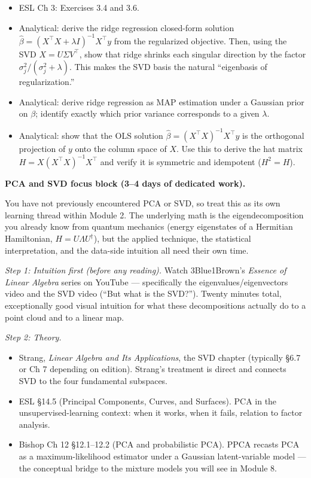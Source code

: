 \begin{itemize}
\tightlist
\item
  ESL Ch 3: Exercises 3.4 and 3.6.
\item
  Analytical: derive the ridge regression closed-form solution
  \(\hat{\beta} = (X^\top X + \lambda I)^{-1} X^\top y\) from the
  regularized objective. Then, using the SVD \(X = U \Sigma V^\top\),
  show that ridge shrinks each singular direction by the factor
  \(\sigma_j^2 / (\sigma_j^2 + \lambda)\). This makes the SVD basis the
  natural ``eigenbasis of regularization.''
\item
  Analytical: derive ridge regression as MAP estimation under a Gaussian
  prior on \(\beta\); identify exactly which prior variance corresponds
  to a given \(\lambda\).
\item
  Analytical: show that the OLS solution
  \(\hat{\beta} = (X^\top X)^{-1} X^\top y\) is the orthogonal
  projection of \(y\) onto the column space of \(X\). Use this to derive
  the hat matrix \(H = X(X^\top X)^{-1} X^\top\) and verify it is
  symmetric and idempotent (\(H^2 = H\)).
\end{itemize}

\textbf{PCA and SVD focus block (3--4 days of dedicated work).}

You have not previously encountered PCA or SVD, so treat this as its own
learning thread within Module 2. The underlying math is the
eigendecomposition you already know from quantum mechanics (energy
eigenstates of a Hermitian Hamiltonian, \(H = U \Lambda U^\dagger\)),
but the applied technique, the statistical interpretation, and the
data-side intuition all need their own time.

\emph{Step 1: Intuition first (before any reading).} Watch 3Blue1Brown's
\emph{Essence of Linear Algebra} series on YouTube --- specifically the
eigenvalues/eigenvectors video and the SVD video (``But what is the
SVD?''). Twenty minutes total, exceptionally good visual intuition for
what these decompositions actually do to a point cloud and to a linear
map.

\emph{Step 2: Theory.}

\begin{itemize}
\tightlist
\item
  Strang, \emph{Linear Algebra and Its Applications}, the SVD chapter
  (typically §6.7 or Ch 7 depending on edition). Strang's treatment is
  direct and connects SVD to the four fundamental subspaces.
\item
  ESL §14.5 (Principal Components, Curves, and Surfaces). PCA in the
  unsupervised-learning context: when it works, when it fails, relation
  to factor analysis.
\item
  Bishop Ch 12 §12.1--12.2 (PCA and probabilistic PCA). PPCA recasts PCA
  as a maximum-likelihood estimator under a Gaussian latent-variable
  model --- the conceptual bridge to the mixture models you will see in
  Module 8.
\end{itemize}

